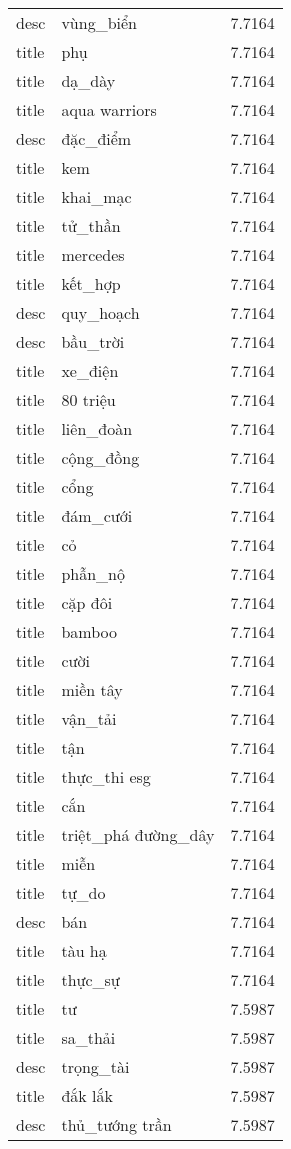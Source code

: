 \documentclass{article}
\begin{document}
\begin{tabular}{lll}
desc & vùng\_biển & 7.7164\\
title & phụ & 7.7164\\
title & dạ\_dày & 7.7164\\
title & aqua warriors & 7.7164\\
desc & đặc\_điểm & 7.7164\\
title & kem & 7.7164\\
title & khai\_mạc & 7.7164\\
title & tử\_thần & 7.7164\\
title & mercedes & 7.7164\\
title & kết\_hợp & 7.7164\\
desc & quy\_hoạch & 7.7164\\
desc & bầu\_trời & 7.7164\\
title & xe\_điện & 7.7164\\
title & 80 triệu & 7.7164\\
title & liên\_đoàn & 7.7164\\
title & cộng\_đồng & 7.7164\\
title & cổng & 7.7164\\
title & đám\_cưới & 7.7164\\
title & cỏ & 7.7164\\
title & phẫn\_nộ & 7.7164\\
title & cặp đôi & 7.7164\\
title & bamboo & 7.7164\\
title & cười & 7.7164\\
title & miền tây & 7.7164\\
title & vận\_tải & 7.7164\\
title & tận & 7.7164\\
title & thực\_thi esg & 7.7164\\
title & cắn & 7.7164\\
title & triệt\_phá đường\_dây & 7.7164\\
title & miễn & 7.7164\\
title & tự\_do & 7.7164\\
desc & bán & 7.7164\\
title & tàu hạ & 7.7164\\
title & thực\_sự & 7.7164\\
title & tư & 7.5987\\
title & sa\_thải & 7.5987\\
desc & trọng\_tài & 7.5987\\
title & đắk lắk & 7.5987\\
desc & thủ\_tướng trần & 7.5987\\

\end{tabular}
\end{document}
